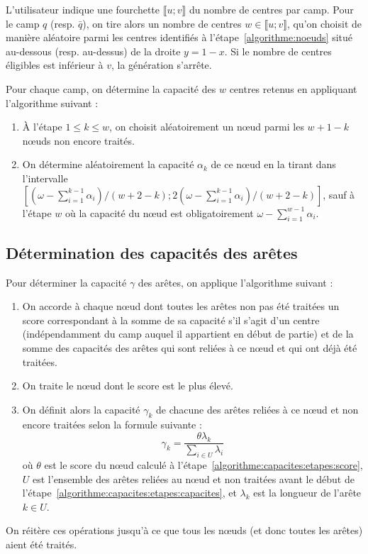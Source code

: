 \documentclass[a4paper,11pt,headings=normal]{scrartcl}
\theoremstyle{mythm}
\begin{document}
L'utilisateur indique une fourchette $\llbracket u ; v \rrbracket$ du
nombre de centres par camp. Pour le camp $q$ (resp. $\bar q$), on tire
alors un nombre de centres $w \in \llbracket u ; v \rrbracket$, qu'on
choisit de manière aléatoire parmi les centres identifiés à
l'étape~\ref{algorithme:noeuds} situé au-dessous (resp. au-dessus) de
la droite $y = 1 - x$. Si le nombre de centres éligibles est inférieur
à $v$, la génération s'arrête.

Pour chaque camp, on détermine la capacité des $w$ centres retenus en
appliquant l'algorithme suivant :
\begin{enumerate}
  \item {\`A} l'étape $1 \leq k \leq w$, on choisit aléatoirement un
    nœud parmi les $w + 1 - k$ nœuds non encore traités.

  \item On détermine aléatoirement la capacité $\alpha_k$ de ce nœud
    en la tirant dans l'intervalle $[ (\omega - \sum_{i=1}^{k-1}
      \alpha_i) / (w + 2 - k) ; 2 (\omega - \sum_{i=1}^{k-1} \alpha_i)
      / (w + 2 - k)]$, sauf à l'étape $w$ où la capacité du nœud est
    obligatoirement $\omega - \sum_{i=1}^{w-1} \alpha_i$.
\end{enumerate}

\subsection{Détermination des capacités des arêtes}
\label{algorithme:capacites}

Pour déterminer la capacité $\gamma$ des arêtes, on applique
l'algorithme suivant :
\begin{enumerate}
  \item\label{algorithme:capacites:etapes:score} On accorde à chaque
    nœud dont toutes les arêtes non pas été traitées un score
    correspondant à la somme de sa capacité s'il s'agit d'un centre
    (indépendamment du camp auquel il appartient en début de partie)
    et de la somme des capacités des arêtes qui sont reliées à ce nœud
    et qui ont déjà été traitées.

  \item On traite le nœud dont le score est le plus élevé.

  \item\label{algorithme:capacites:etapes:capacites} On définit alors
    la capacité $\gamma_k$ de chacune des arêtes reliées à ce nœud et
    non encore traitées selon la formule suivante :
    \begin{equation}
      \gamma_k = \frac{\theta \lambda_k}{\sum_{i \in U} \lambda_i}
    \end{equation}
    où $\theta$ est le score du nœud calculé à
    l'étape~\ref{algorithme:capacites:etapes:score}, $U$ est
    l'ensemble des arêtes reliées au nœud et non traitées avant le
    début de l'étape~\ref{algorithme:capacites:etapes:capacites}, et
    $\lambda_k$ est la longueur de l'arête $k \in U$.
\end{enumerate}
On réitère ces opérations jusqu'à ce que tous les nœuds (et donc
toutes les arêtes) aient été traités.

\printbibliography
\end{document}

